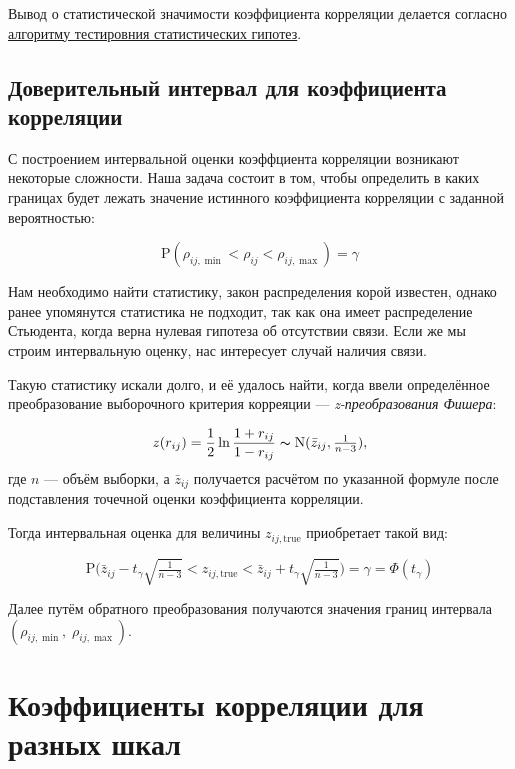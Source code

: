 \documentclass[
  letterpaper,
  DIV=11,
  numbers=noendperiod]{scrreprt}
\theoremstyle{definition}
\theoremstyle{remark}
\begin{document}
Вывод о статистической значимости коэффициента корреляции делается
согласно \hyperref[statestim]{алгоритму тестировния статистических
гипотез}.

\subsection{Доверительный интервал для коэффициента
корреляции}\label{ux434ux43eux432ux435ux440ux438ux442ux435ux43bux44cux43dux44bux439-ux438ux43dux442ux435ux440ux432ux430ux43b-ux434ux43bux44f-ux43aux43eux44dux444ux444ux438ux446ux438ux435ux43dux442ux430-ux43aux43eux440ux440ux435ux43bux44fux446ux438ux438}

С построением интервальной оценки коэффциента корреляции возникают
некоторые сложности. Наша задача состоит в том, чтобы определить в каких
границах будет лежать значение истинного коэффициента корреляции с
заданной вероятностью:

\[
\mathrm{P} (\rho_{ij,\min} < \rho_{ij} < \rho_{ij,\max}) = \gamma
\]

Нам необходимо найти статистику, закон распределения корой известен,
однако ранее упомянутся статистика не подходит, так как она имеет
распределение Стьюдента, когда верна нулевая гипотеза об отсутствии
связи. Если же мы строим интервальную оценку, нас интересует случай
наличия связи.

Такую статистику искали долго, и её удалось найти, когда ввели
определённое преобразование выборочного критерия корреяции ---
\emph{z-преобразования Фишера}:

\[
z(r_{ij}) = \frac{1}{2} \ln \frac{1 + r_{ij}}{1 - r_{ij}} \thicksim \mathrm{N}(\bar z_{ij}, \tfrac{1}{n-3}),
\] где \(n\) --- объём выборки, а \(\bar z_{ij}\) получается расчётом по
указанной формуле после подставления точечной оценки коэффициента
корреляции.

Тогда интервальная оценка для величины \(z_{ij, \mathrm{true}}\)
приобретает такой вид:

\[
\mathrm{P} \Big( \bar z_{ij} - t_\gamma \sqrt{\tfrac{1}{n-3}} < z_{ij, \mathrm{true}} < \bar z_{ij} + t_\gamma \sqrt{\tfrac{1}{n-3}}  \Big) = \gamma = \Phi(t_\gamma)
\]

Далее путём обратного преобразования получаются значения границ
интервала \((\rho_{ij,\min}, \; \rho_{ij,\max})\).

\section{Коэффициенты корреляции для разных
шкал}\label{andan-corr-scales}
\end{document}
